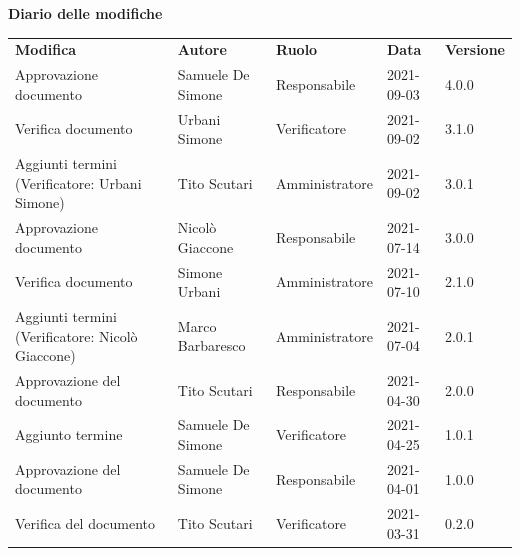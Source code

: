 \documentclass[a4paper]{article}
\begin{document}
\begin{center}
    \textbf{\Large Diario delle modifiche}\\
    \vspace{10px}
    \begin{table}[h!]
        \centering
        \renewcommand{\arraystretch}{1.8}
        \begin{tabular}{p{140px} p{90px} p{70px} p{60px} p{45px}}
            \rowcolor{logo!70} \textbf{Modifica}                      & \textbf{Autore}   & \textbf{Ruolo} & \textbf{Data} & \textbf{Versione} \\
            Approvazione documento                                    & Samuele De Simone & Responsabile   & 2021-09-03    & 4.0.0             \\
            Verifica documento                                        & Urbani Simone     & Verificatore   & 2021-09-02    & 3.1.0             \\
            Aggiunti termini \newline (Verificatore: Urbani Simone)   & Tito Scutari      & Amministratore & 2021-09-02    & 3.0.1             \\
            Approvazione documento                                    & Nicolò Giaccone   & Responsabile   & 2021-07-14    & 3.0.0             \\
            Verifica documento                                        & Simone Urbani     & Amministratore & 2021-07-10    & 2.1.0             \\
            Aggiunti termini \newline (Verificatore: Nicolò Giaccone) & Marco Barbaresco  & Amministratore & 2021-07-04    & 2.0.1             \\
            Approvazione del documento                                & Tito Scutari      & Responsabile   & 2021-04-30    & 2.0.0             \\
            Aggiunto termine                                          & Samuele De Simone & Verificatore   & 2021-04-25    & 1.0.1             \\
            Approvazione del documento                                & Samuele De Simone & Responsabile   & 2021-04-01    & 1.0.0             \\
            Verifica del documento                                    & Tito Scutari      & Verificatore   & 2021-03-31    & 0.2.0             \\

\end{tabular}
\end{table}
\end{center}
\end{document}

